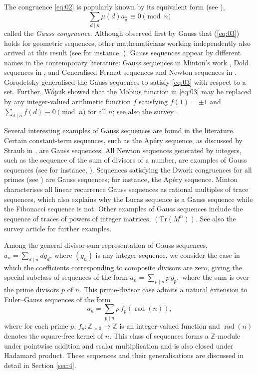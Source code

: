 \documentclass{article}
\numberwithin{equation}{section}
\theoremstyle{definition}
\begin{document}
The congruence \eqref{eq:02} is popularly known by its equivalent form (see \cite[Exercise 5.2(a)]{stanley_2}),  
\begin{equation}\label{eq:03}
    \sum_{d\mid n}\mu(d)a_\frac{n}{d}\equiv0\pmod{n}
\end{equation}
called the \textit{Gauss congruence}. Although observed first by Gauss that (\ref{eq:03}) holds for geometric sequences, other mathematicians working independently also arrived at this result (see for instance, \cite{dickson,Smyth,zarelua}). Gauss sequences appear by different names in the contemporary literature: 
Gauss sequences in Minton's work \cite{minton_gauss}, Dold sequences in \cite{dold_survey,dold}, and Generalised Fermat sequences and Newton sequences in \cite{generalized_fermat, fern_gauss}. Gorodetsky \cite{goro_q-gauss} generalised the Gauss sequences to satisfy \eqref{eq:03} with respect to a set. Further, W\'ojcik \cite{Wojcik_mobius_replace_gauss} showed that the M\"obius function in \eqref{eq:03} may be replaced by any integer-valued arithmetic function $f$ satisfying $f(1)=\pm1$ and $\sum_{d\mid n}f(d)\equiv0\pmod n$ for all $n$; see also the survey \cite{dold_survey}. 

Several interesting examples of Gauss sequences are found in the literature. Certain constant-term sequences, such as the Apéry sequence, as discussed by Straub in \cite{armin_constant}, are Gauss sequences. All Newton sequences generated by integers, such as the sequence of the sum of divisors of a number, are examples of Gauss sequences (see for instance, \cite{generalized_fermat}). Sequences satisfying the Dwork congruences for all primes (see \cite{dwork_congruence}) are Gauss sequences; for instance, the Apéry sequence. Minton \cite{minton_gauss} characterises all linear recurrence Gauss sequences as rational multiples of trace sequences, which also explains why the Lucas sequence is a Gauss sequence while the Fibonacci sequence is not. Other examples of Gauss sequences include the sequence of traces of powers of integer matrices, $(\text{Tr}(M^n))$.
See also the survey article \cite{zarelua} for further examples.

Among the general divisor-sum representation of Gauss sequences, $a_n=\sum_{d\mid n}dg_d$, where $(g_n)$ is any integer sequence, we consider the case in which the coefficients corresponding to composite divisors are zero, giving the special subclass of sequences of the form $a_n=\sum_{p\mid n}p\,g_p,$
where the sum is over the prime divisors $p$ of $n$. This prime-divisor case admits a natural extension to Euler--Gauss sequences of the form
\begin{equation}\label{eq:029}
a_n=\sum_{p\mid n}p\,f_p(\operatorname{rad}(n)),
\end{equation}
where for each prime $p$, $f_p:\mathbb{Z}_{>0}\to\mathbb{Z}$ is an integer-valued function and $\operatorname{rad}(n)$ denotes the square-free kernel of $n$. This class of sequences forms a $\mathbb{Z}$-module under pointwise addition and scalar multiplication and is also closed under Hadamard product. These sequences and their generalisations are discussed in detail
in Section \ref{sec:4}.
\end{document}
